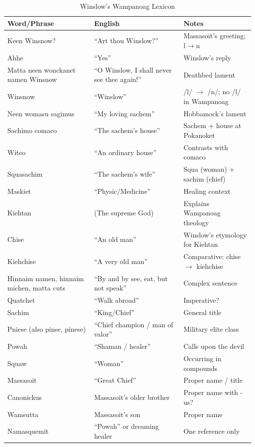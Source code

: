 \begin{table}[htbp]
\centering
\caption{Winslow's Wampanoag Lexicon}
\label{tab:1366-lexicon}
\begin{tabular}{lll}
\hline
Word/Phrase & English & Notes \\
\hline
Keen Winsnow? & ``Art thou Winslow?'' & Massasoit's greeting; l$\rightarrow$n \\
Ahhe & ``Yes'' & Winslow's reply \\
Matta neen wonckanet namen Winsnow & ``O Winslow, I shall never see thee again!'' & Deathbed lament \\
Winsnow & ``Winslow'' & /l/ $\rightarrow$ /n/; no /l/ in Wampanoag \\
Neen womasu sagimus & ``My loving sachem'' & Hobbamock's lament \\
Sachimo comaco & ``The sachem's house'' & Sachem + house at Pokanoket \\
Witeo & ``An ordinary house'' & Contrasts with comaco \\
Squasachim & ``The sachem's wife'' & Squa (woman) + sachim (chief) \\
Maskiet & ``Physic/Medicine'' & Healing context \\
Kiehtan & (The supreme God) & Explains Wampanoag theology \\
Chise & ``An old man'' & Winslow's etymology for Kiehtan \\
Kiehchise & ``A very old man'' & Comparative: chise $\rightarrow$ kiehchise \\
Hinnaim namen, hinnaim michen, matta cuts & ``By and by see, eat, but not speak'' & Complex sentence \\
Quatchet & ``Walk abroad'' & Imperative? \\
Sachim & ``King/Chief'' & General title \\
Pniese (also pinse, pinese) & ``Chief champion / man of valor'' & Military elite class \\
Powah & ``Shaman / healer'' & Calls upon the devil \\
Squaw & ``Woman'' & Occurring in compounds \\
Massasoit & ``Great Chief'' & Proper name / title \\
Canonickus & Massasoit's older brother & Proper name with -us? \\
Wamsutta & Massasoit's son & Proper name \\
Namasquemit & ``Powah'' or dreaming healer & One reference only \\
\hline
\end{tabular}
\end{table}

